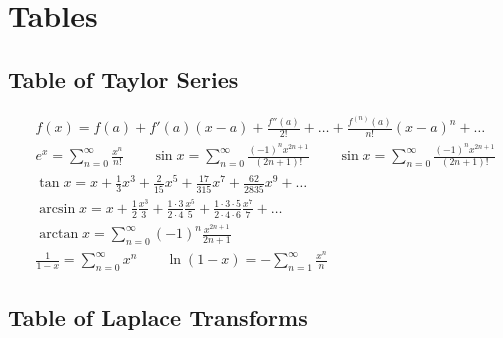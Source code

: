 \documentclass[12pt]{book}
\begin{document}
\appendix{}
\chapter{Tables}


\section{Table of Taylor Series}
\begin{align*}
& f(x) = f(a) + f'(a)(x-a) + \frac{f''(a)}{2!} + \dots
+ \frac{f^{(n)}(a)}{n!}(x-a)^n + \dots
\\
& e^x = \sum_{n=0}^\infty \frac{x^n}{n!}
\qquad \sin x = \sum_{n=0}^\infty \frac{(-1)^n x^{2n+1}}{(2n+1)!}
\qquad \sin x = \sum_{n=0}^\infty \frac{(-1)^n x^{2n+1}}{(2n+1)!}
\\
&\tan x = x + \frac{1}{3}x^3 + \frac{2}{15}x^5 + \frac{17}{315}x^7
+ \frac{62}{2835}x^9 + \dots
\\
&\arcsin x = x + \frac{1}{2}\frac{x^3}{3}
+ \frac{1\cdot 3}{2\cdot 4}\frac{x^5}{5}
+ \frac{1\cdot3\cdot5}{2\cdot4\cdot6}\frac{x^7}{7} + \dots
\\
&\arctan x = \sum_{n=0}^\infty (-1)^n \frac{x^{2n+1}}{2n+1}
\\
&\frac{1}{1-x} = \sum_{n=0}^\infty x^n
\qquad \ln(1-x) = -\sum_{n=1}^\infty \frac{x^n}{n}
\end{align*}

\newpage
\section{Table of Laplace Transforms}
\end{document}
